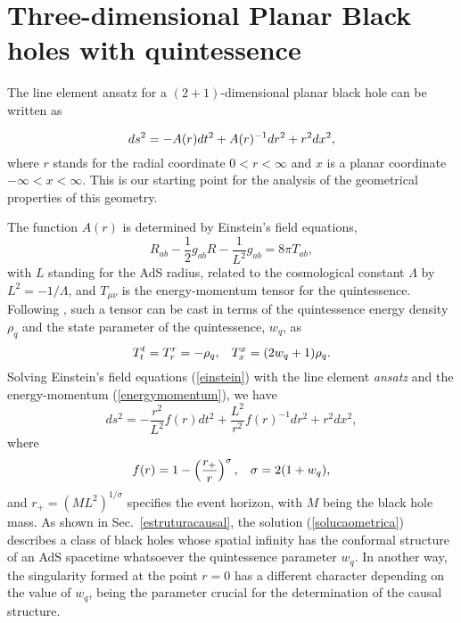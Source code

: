 \documentclass[preprint]{revtex4-1}
\begin{document}
\section{Three-dimensional Planar Black holes with quintessence}\label{solucao}


The line element ansatz for a $(2+1)$-dimensional planar black hole can be written as

\begin{equation}{\label{metrica1}}
ds^{2}=-A(r)dt^{2}+A(r)^{-1}dr^{2}+r^{2}dx^{2},
\end{equation}
where $r$ stands for the radial coordinate $0<r<\infty$ and $x$ is a planar coordinate $-\infty<x<\infty$. This is our starting point for the analysis of the geometrical properties of this geometry. %

The function  $A(r)$ is determined by Einstein's field equations,
\begin{equation}\label{einstein}
R_{ab}-\frac{1}{2}g_{ab}R-\frac{1}{L^{2}}g_{ab}=8\pi T_{ab},
\end{equation}
with $L$ standing for the AdS radius, related to the cosmological constant $\Lambda$ by $L^{2}=-1/\Lambda$, and $T_{\mu\nu }$ is the energy-momentum tensor for the quintessence. Following \cite{Chen:2012mva} \cite{0264-9381-20-6-310}, such a tensor can be cast in terms of the quintessence energy density $\rho_{q}$ and the state parameter of the quintessence, $w_q$, as
\begin{equation}\label{energymomentum}
T^{t}_{t}=T^{r}_{r}=-\rho_{q}, \hspace{0.3cm} T^{x}_{x}=(2w_q+1)\rho_{q}.
\end{equation}
Solving Einstein's field equations (\ref{einstein}) with the line element {\it{ansatz}} and the energy-momentum (\ref{energymomentum}), we have
\begin{equation}\label{solucaometrica}
ds^{2}=-\frac{r^{2}}{L^{2}}f(r)dt^{2}+\frac{L^{2}}{r^{2}}f(r)^{-1}dr^{2}+r^{2}dx^2,
\end{equation}
where 
\[
f(r)=1-\left(\frac{r_{+}}{r}\right)^{\sigma}, \hspace{0.3cm}  \sigma=2(1+w_{q}),
\]
and $r_{+}=\left(M L^2 \right)^{1/\sigma}$ specifies the event horizon, with $M$ being the black hole mass. As shown in Sec.~\ref{estruturacausal}, the solution (\ref{solucaometrica}) describes a class of black holes whose spatial infinity has the conformal structure of an AdS spacetime whatsoever the quintessence parameter $w_q$. In another way, the singularity formed at the point $r=0$ has a different character depending on the value of $w_q$, being the parameter crucial for the determination of the causal structure.
\end{document}
